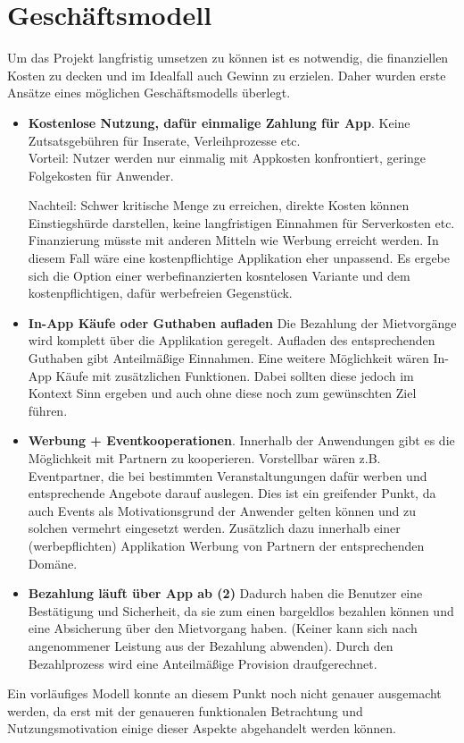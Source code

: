 
\section{Geschäftsmodell}
Um das Projekt langfristig umsetzen zu können ist es notwendig, die finanziellen Kosten zu decken und im Idealfall auch Gewinn zu erzielen. 
Daher wurden erste Ansätze eines möglichen Geschäftsmodells überlegt.

\begin{itemize}
   \item \textbf{Kostenlose Nutzung, dafür einmalige Zahlung für App}. Keine Zutsatsgebühren für Inserate, Verleihprozesse etc.\\
   Vorteil: Nutzer werden nur einmalig mit Appkosten konfrontiert, geringe Folgekosten für Anwender.

   Nachteil: Schwer kritische Menge zu erreichen, direkte Kosten können Einstiegshürde darstellen, keine langfristigen Einnahmen für Serverkosten etc. Finanzierung müsste mit anderen Mitteln wie Werbung erreicht werden. In diesem Fall wäre eine kostenpflichtige Applikation eher unpassend. Es ergebe sich die Option einer werbefinanzierten kosntelosen Variante und dem kostenpflichtigen, dafür werbefreien Gegenstück.

   \item \textbf{In-App Käufe oder Guthaben aufladen} 
   Die Bezahlung der Mietvorgänge wird komplett über die Applikation geregelt. Aufladen des entsprechenden Guthaben gibt Anteilmäßige Einnahmen. Eine weitere Möglichkeit wären In-App Käufe mit zusätzlichen Funktionen. Dabei sollten diese jedoch im Kontext Sinn ergeben und auch ohne diese noch zum gewünschten Ziel führen. 

   \item \textbf{Werbung + Eventkooperationen}.
   Innerhalb der Anwendungen gibt es die Möglichkeit mit Partnern zu kooperieren. Vorstellbar wären z.B. Eventpartner, die bei bestimmten Veranstaltungungen dafür werben und entsprechende Angebote darauf auslegen. Dies ist ein greifender Punkt, da auch Events als Motivationsgrund der Anwender gelten können und zu solchen vermehrt eingesetzt werden. Zusätzlich dazu innerhalb einer (werbepflichten) Applikation Werbung von Partnern der entsprechenden Domäne.

   \item \textbf{Bezahlung läuft über App ab (2)} 
   Dadurch haben die Benutzer eine Bestätigung und Sicherheit, da sie zum einen bargeldlos bezahlen können und eine Absicherung über den Mietvorgang haben. (Keiner kann sich nach angenommener Leistung aus der Bezahlung abwenden). Durch den Bezahlprozess wird eine Anteilmäßige Provision draufgerechnet. 

\end{itemize}
 
Ein vorläufiges Modell konnte an diesem Punkt noch nicht genauer ausgemacht werden, da erst mit der genaueren funktionalen Betrachtung und Nutzungsmotivation einige dieser Aspekte abgehandelt werden können. 